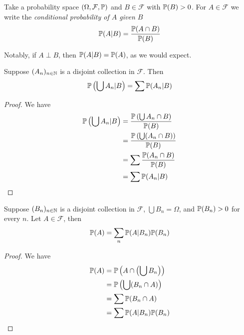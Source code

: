 \documentclass{../template/note}
\begin{document}
    \begin{definition}
        Take a probability space \((\Omega, \mathcal F, \mathbb P)\) and \(B \in \mathcal F\) with \(\mathbb P(B) > 0\). For \(A \in \mathcal F\) we write the \emph{conditional probability of \(A\) given \(B\)} 
        \begin{align*}
            \mathbb P(A |  B) = \frac{\mathbb P(A \cap B)}{\mathbb P(B)}
        \end{align*}
    \end{definition}
    
    \begin{remark*}
        Notably, if \(A \perp B\), then \(\mathbb P(A |  B) = \mathbb P(A)\), as we would expect.
    \end{remark*}
    
    \begin{proposition}
        Suppose \((A_n)_{n \in \mathbb N}\) is a disjoint collection in \(\mathcal F\). Then
        \begin{align*}
            \mathbb P\left(\bigcup A_n |  B \right) = \sum \mathbb P(A_n |  B)
        \end{align*}
    \end{proposition}
    
    \begin{proof}
        We have
        \begin{align*}
            \mathbb P\left(\bigcup A_n |  B\right) &= \frac{\mathbb P\left(\bigcup A_n \cap B\right)}{\mathbb P(B)} \\
            &= \frac{\mathbb P\left(\bigcup (A_n \cap B)\right)}{\mathbb P(B)} \\
            &= \sum \frac{\mathbb P(A_n \cap B)}{\mathbb P(B)} \\
            &= \sum \mathbb P(A_n |  B)
        \end{align*}
    \end{proof}
    
    \begin{proposition}
        Suppose \((B_n)_{n \in \mathbb N}\) is a disjoint collection in \(\mathcal F\), \(\bigcup B_n = \Omega\), and \(\mathbb P(B_n) > 0\) for every \(n\). Let \(A \in \mathcal F\), then
        \begin{align*}
            \mathbb P(A) = \sum_n \mathbb P(A |  B_n) \mathbb P(B_n)
        \end{align*}
    \end{proposition}

    \begin{proof}
        We have
        \begin{align*}
            \mathbb P(A) &= \mathbb P\left(A \cap \left(\bigcup B_n\right)\right) \\
            &= \mathbb P\left(\bigcup (B_n \cap A)\right) \\
            &= \sum \mathbb P(B_n \cap A) \\
            &= \sum \mathbb P(A |  B_n) \mathbb P(B_n)
        \end{align*}
    \end{proof}
    
\end{document}
